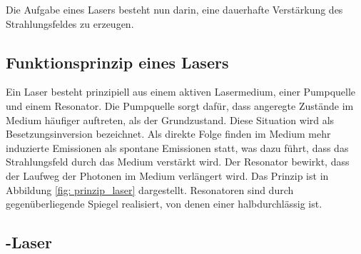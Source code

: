 Die Aufgabe eines Lasers besteht nun darin, eine dauerhafte Verstärkung des Strahlungsfeldes zu erzeugen.

\subsection{Funktionsprinzip eines Lasers}
Ein Laser besteht prinzipiell aus einem aktiven Lasermedium, einer Pumpquelle und einem Resonator. Die Pumpquelle sorgt dafür, dass
angeregte Zustände im Medium häufiger auftreten, als der Grundzustand. Diese Situation wird als Besetzungsinversion bezeichnet. Als direkte
Folge finden im Medium mehr induzierte Emissionen als spontane Emissionen statt, was dazu führt, dass das Strahlungsfeld durch das Medium verstärkt wird.
Der Resonator bewirkt, dass der Laufweg der Photonen im Medium verlängert wird. Das Prinzip ist in Abbildung \ref{fig: prinzip_laser} dargestellt.
Resonatoren sind durch gegenüberliegende Spiegel realisiert, von denen einer halbdurchlässig ist.



\subsection{-Laser }
